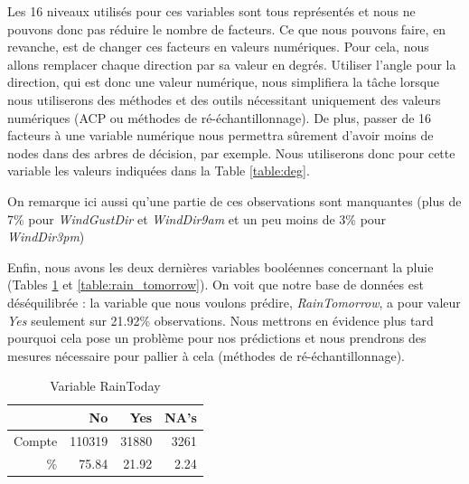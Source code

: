 \documentclass{article}
\begin{document}
Les 16 niveaux utilisés pour ces variables sont tous représentés et nous ne pouvons donc pas réduire le nombre de facteurs. Ce que nous pouvons faire, en revanche, est de changer ces facteurs en valeurs numériques. Pour cela, nous allons remplacer chaque direction par sa valeur en degrés. Utiliser l'angle pour la direction, qui est donc une valeur numérique, nous simplifiera la tâche lorsque nous utiliserons des méthodes et des outils nécessitant uniquement des valeurs numériques (ACP ou méthodes de ré-échantillonnage). De plus, passer de 16 facteurs à une variable numérique nous permettra sûrement d'avoir moins de nodes dans des arbres de décision, par exemple. Nous utiliserons donc pour cette variable les valeurs indiquées dans la Table \ref{table:deg}.

\begin{table}[htp]
    \centering
    \caption{Les 16 points cardinaux en degrés}
    \label{table:deg}
\end{table}

On remarque ici aussi qu'une partie de ces observations sont manquantes (plus de 7\% pour \emph{WindGustDir} et \emph{WindDir9am} et un peu moins de 3\% pour \emph{WindDir3pm})

Enfin, nous avons les deux dernières variables booléennes concernant la pluie (Tables \ref{table:rain_today} et \ref{table:rain_tomorrow}). On voit que notre base de données est déséquilibrée : la variable que nous voulons prédire, \emph{RainTomorrow}, a pour valeur \emph{Yes} seulement sur 21.92\% observations. Nous mettrons en évidence plus tard pourquoi cela pose un problème pour nos prédictions et nous prendrons des mesures nécessaire pour pallier à cela (méthodes de ré-échantillonnage).  

\begin{table}[htp]
    \centering
    \begin{tabular}{|r||rrr|}
        \hline
        &    No &    Yes &   NA's \\
        \hline
        \hline
        Compte & 110319 &  31880 &   3261 \\
        \% & 75.84 & 21.92 & 2.24 \\
        \hline
    \end{tabular}
    \caption{Variable RainToday}
    \label{table:rain_today}
\end{table}
\end{document}
